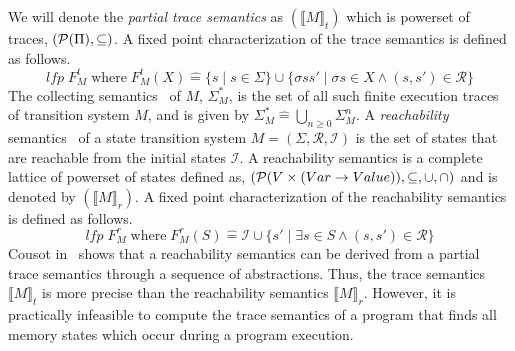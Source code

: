 {%
We will denote the \emph{partial trace semantics} as $(\llbracket M \rrbracket_{t})$ 
which is powerset of traces, $(\mathcal{P}(\Pi), \subseteq)$.  
%
A fixed point characterization of the trace semantics is defined as follows. 
%
\[
  \mathit{lfp}\; F_{M}^{t}\; \text{where}\; F_{M}^{t}(X) \mathrel{\hat=} \{s \mid s \in
  \Sigma\} \cup \{\sigma ss' \mid \sigma s \in X \wedge (s,s') \in \mathcal{R} \}
\]
%
%
The collecting semantics~\cite{Cousot04} of $M$, $\Sigma_{M}^{*}$, 
is the set of all such finite execution traces of transition system $M$, and is given by 
$\Sigma_M^*\mathrel{\hat=} \bigcup_{n\geq0}\Sigma_M^{n}$. 
%
%
%
A \emph{reachability} semantics~\cite{minepaper} of a state transition 
system $M=(\Sigma, \mathcal{R},\mathcal{I})$ is the set of states that are 
reachable from the initial states $\mathcal{I}$. A reachability
semantics is a complete lattice of powerset of
states defined as, $(\mathcal{P}(V \times (Var \rightarrow Value)), \subseteq,
\cup, \cap)$ and is denoted by $(\llbracket M \rrbracket_{r})$. 
%
A fixed point characterization of the reachability semantics is
defined as follows.
\[
  \mathit{lfp}\; F_M^{r}\; \text{where}\; F_{M}^{r}(S) \mathrel{\hat=} \mathcal{I} \cup \{s' \mid
   \exists s \in S \wedge (s,s') \in \mathcal{R} \} 
\]
%
Cousot in~\cite{Cousot04} shows that a reachability semantics can be derived
from a partial trace semantics through a sequence of abstractions.  Thus, 
the trace semantics $\llbracket M \rrbracket_{t}$ is more precise than the 
reachability semantics $\llbracket M \rrbracket_{r}$.  However, it is
practically infeasible to compute the trace semantics of a program 
that finds all memory states which occur during a program execution. 
%
}
